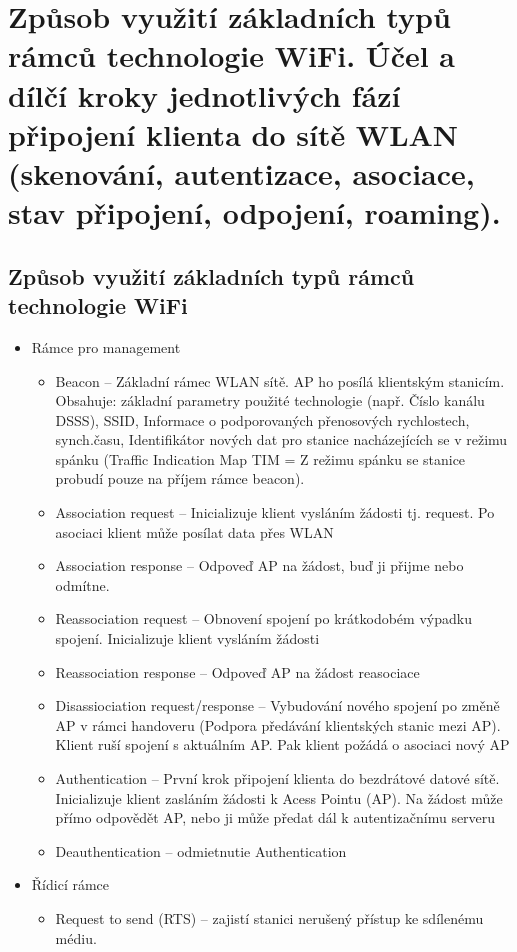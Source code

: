 \section{Způsob využití základních typů rámců technologie WiFi. Účel a dílčí kroky jednotlivých fází připojení klienta do sítě WLAN (skenování, autentizace, asociace, stav připojení, odpojení, roaming).}
\subsection{Způsob využití základních typů rámců technologie WiFi}
\begin{itemize}
\item Rámce pro management
\begin{itemize}
\item Beacon -- Základní rámec WLAN sítě. AP ho posílá klientským stanicím. Obsahuje: základní
parametry použité technologie (např. Číslo kanálu DSSS), SSID, Informace o podporovaných
přenosových rychlostech, synch.času, Identifikátor nových dat pro stanice nacházejících se v režimu
spánku (Traffic Indication Map TIM = Z režimu spánku se stanice probudí pouze na příjem rámce
beacon).
\item Association request -- Inicializuje klient vysláním žádosti tj. request. Po asociaci klient může posílat data přes WLAN
\item Association response -- Odpoveď AP na žádost, buď ji přijme nebo odmítne. 
\item Reassociation request -- Obnovení spojení po krátkodobém výpadku spojení. Inicializuje
klient vysláním žádosti
\item Reassociation response -- Odpoveď AP na žádost reasociace
\item Disassiociation request/response -- Vybudování nového spojení po změně AP v rámci handoveru (Podpora
předávání klientských stanic mezi AP). Klient ruší spojení s aktuálním AP. Pak klient požádá o asociaci
nový AP 
\item Authentication -- První krok připojení klienta do bezdrátové datové sítě. Inicializuje klient zasláním
žádosti k Acess Pointu (AP). Na žádost může přímo odpovědět AP, nebo ji může předat dál
k autentizačnímu serveru
\item Deauthentication -- odmietnutie Authentication 
\end{itemize}
\item Řídicí rámce
\begin{itemize}
\item Request to send (RTS) -- zajistí stanici nerušený přístup ke sdílenému médiu.

\end{itemize}
\end{itemize}
